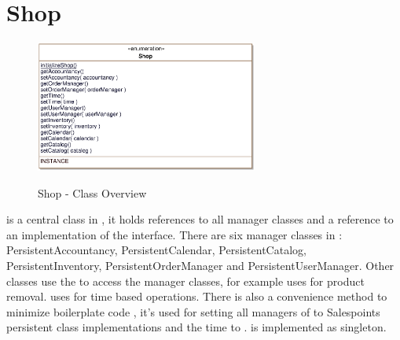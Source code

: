 \section{Shop}
\label{shop}

\begin{figure}[ht]
	\centering
  \includegraphics[width=0.65\textwidth]{images/Shop_Overview.eps}
	\label{shop_overview}
	\caption{Shop - Class Overview}
\end{figure}

 is a central class in \salespoint{}, it holds references to all manager classes and a reference to an implementation of the  interface.
There are six manager classes in \salespoint{}: PersistentAccountancy, PersistentCalendar, PersistentCatalog, PersistentInventory, PersistentOrderManager and PersistentUserManager.
Other classes use the  to access the manager classes, for example  uses  for product removal.
 uses  for time based operations.
There is also a convenience method to minimize boilerplate code , it's used for setting all managers of  to Salespoints persistent class implementations and the time to .
 is implemented as singleton.